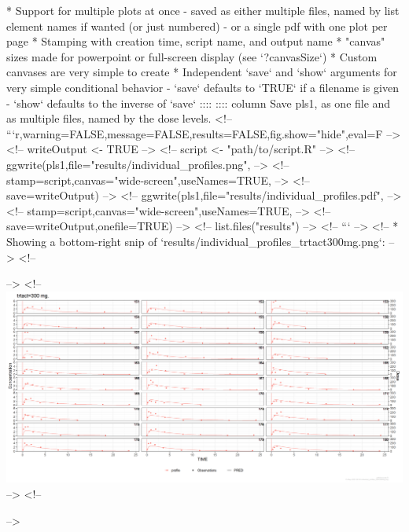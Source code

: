 {{{{{{{{{{* Support for multiple plots at once
- saved as either multiple files, named by list element names if wanted (or just numbered)
- or a single pdf with one plot per page
* Stamping with creation time, script name, and output name
* "canvas" sizes made for powerpoint or full-screen display (see `?canvasSize`)
* Custom canvases are very simple to create
* Independent `save` and `show` arguments for very simple conditional behavior
- `save` defaults to `TRUE` if a filename is given
- `show` defaults to the inverse of `save`
::::
:::: column
Save pls1, as one file and as multiple files, named by the dose levels.
\footnotesize
<!-- ```{r,warning=FALSE,message=FALSE,results=FALSE,fig.show="hide",eval=F} -->
<!-- writeOutput <- TRUE -->
<!-- script <- "path/to/script.R" -->
<!-- ggwrite(pls1,file="results/individual_profiles.png", -->
<!--         stamp=script,canvas="wide-screen",useNames=TRUE, -->
<!--         save=writeOutput) -->
<!-- ggwrite(pls1,file="results/individual_profiles.pdf", -->
<!--         stamp=script,canvas="wide-screen",useNames=TRUE, -->
<!--         save=writeOutput,onefile=TRUE) -->
<!-- list.files("results") -->
<!-- ``` -->
<!-- * Showing a bottom-right snip of `results/individual_profiles_trtact300mg.png`: -->
<!-- \begin{center} -->
<!-- \includegraphics[trim={30cm 0 0 14cm},clip]{results/individual_profiles_trtact300mg.png} -->
<!-- \end{center} -->


}}}}}}}}}}
